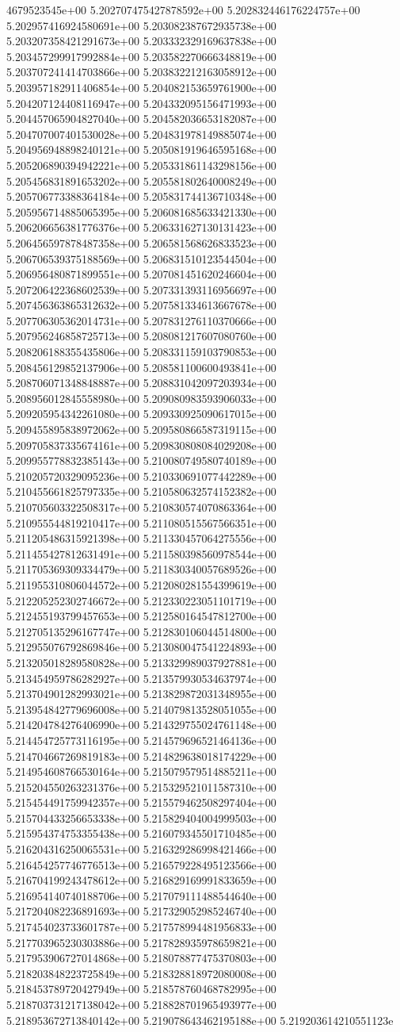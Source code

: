4679523545e+00	5.202707475427878592e+00	5.202832446176224757e+00	5.202957416924580691e+00	5.203082387672935738e+00	5.203207358421291673e+00	5.203332329169637838e+00	5.203457299917992884e+00	5.203582270666348819e+00	5.203707241414703866e+00	5.203832212163058912e+00	5.203957182911406854e+00	5.204082153659761900e+00	5.204207124408116947e+00	5.204332095156471993e+00	5.204457065904827040e+00	5.204582036653182087e+00	5.204707007401530028e+00	5.204831978149885074e+00	5.204956948898240121e+00	5.205081919646595168e+00	5.205206890394942221e+00	5.205331861143298156e+00	5.205456831891653202e+00	5.205581802640008249e+00	5.205706773388364184e+00	5.205831744136710348e+00	5.205956714885065395e+00	5.206081685633421330e+00	5.206206656381776376e+00	5.206331627130131423e+00	5.206456597878487358e+00	5.206581568626833523e+00	5.206706539375188569e+00	5.206831510123544504e+00	5.206956480871899551e+00	5.207081451620246604e+00	5.207206422368602539e+00	5.207331393116956697e+00	5.207456363865312632e+00	5.207581334613667678e+00	5.207706305362014731e+00	5.207831276110370666e+00	5.207956246858725713e+00	5.208081217607080760e+00	5.208206188355435806e+00	5.208331159103790853e+00	5.208456129852137906e+00	5.208581100600493841e+00	5.208706071348848887e+00	5.208831042097203934e+00	5.208956012845558980e+00	5.209080983593906033e+00	5.209205954342261080e+00	5.209330925090617015e+00	5.209455895838972062e+00	5.209580866587319115e+00	5.209705837335674161e+00	5.209830808084029208e+00	5.209955778832385143e+00	5.210080749580740189e+00	5.210205720329095236e+00	5.210330691077442289e+00	5.210455661825797335e+00	5.210580632574152382e+00	5.210705603322508317e+00	5.210830574070863364e+00	5.210955544819210417e+00	5.211080515567566351e+00	5.211205486315921398e+00	5.211330457064275556e+00	5.211455427812631491e+00	5.211580398560978544e+00	5.211705369309334479e+00	5.211830340057689526e+00	5.211955310806044572e+00	5.212080281554399619e+00	5.212205252302746672e+00	5.212330223051101719e+00	5.212455193799457653e+00	5.212580164547812700e+00	5.212705135296167747e+00	5.212830106044514800e+00	5.212955076792869846e+00	5.213080047541224893e+00	5.213205018289580828e+00	5.213329989037927881e+00	5.213454959786282927e+00	5.213579930534637974e+00	5.213704901282993021e+00	5.213829872031348955e+00	5.213954842779696008e+00	5.214079813528051055e+00	5.214204784276406990e+00	5.214329755024761148e+00	5.214454725773116195e+00	5.214579696521464136e+00	5.214704667269819183e+00	5.214829638018174229e+00	5.214954608766530164e+00	5.215079579514885211e+00	5.215204550263231376e+00	5.215329521011587310e+00	5.215454491759942357e+00	5.215579462508297404e+00	5.215704433256653338e+00	5.215829404004999503e+00	5.215954374753355438e+00	5.216079345501710485e+00	5.216204316250065531e+00	5.216329286998421466e+00	5.216454257746776513e+00	5.216579228495123566e+00	5.216704199243478612e+00	5.216829169991833659e+00	5.216954140740188706e+00	5.217079111488544640e+00	5.217204082236891693e+00	5.217329052985246740e+00	5.217454023733601787e+00	5.217578994481956833e+00	5.217703965230303886e+00	5.217828935978659821e+00	5.217953906727014868e+00	5.218078877475370803e+00	5.218203848223725849e+00	5.218328818972080008e+00	5.218453789720427949e+00	5.218578760468782995e+00	5.218703731217138042e+00	5.218828701965493977e+00	5.218953672713840142e+00	5.219078643462195188e+00	5.219203614210551123e